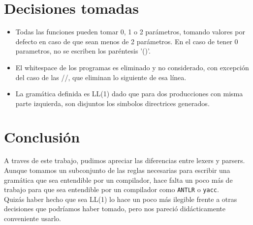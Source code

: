 \documentclass[a4paper]{article}
\begin{document}
\section{Decisiones tomadas}
\begin{itemize}
\item Todas las funciones  pueden tomar 0, 1 o 2 parámetros, tomando valores por defecto en caso de que sean menos de 2 parámetros. En el caso de tener 0 parametros, no se escriben los paréntesis '()'.

\item El whitespace de los programas es eliminado y no considerado, con excepción del caso de las //, que eliminan lo siguiente de esa línea.

\item La gramática definida es LL(1) dado que para dos producciones con misma parte izquierda, son disjuntos los simbolos directrices generados.
\end{itemize}

\section{Conclusión}
A traves de este trabajo, pudimos apreciar las diferencias entre lexers y parsers. Aunque tomamos un subconjunto de las reglas necesarias para escribir una gramática que sea entendible por un compilador,
hace falta un poco más de trabajo para que sea entendible por un compilador como \texttt{ANTLR} o \texttt{yacc}.  \\
Quizás haber hecho que sea LL(1) lo hace un poco más ilegible frente a otras decisiones que podríamos haber tomado, pero nos pareció didácticamente conveniente usarlo.
\end{document}
